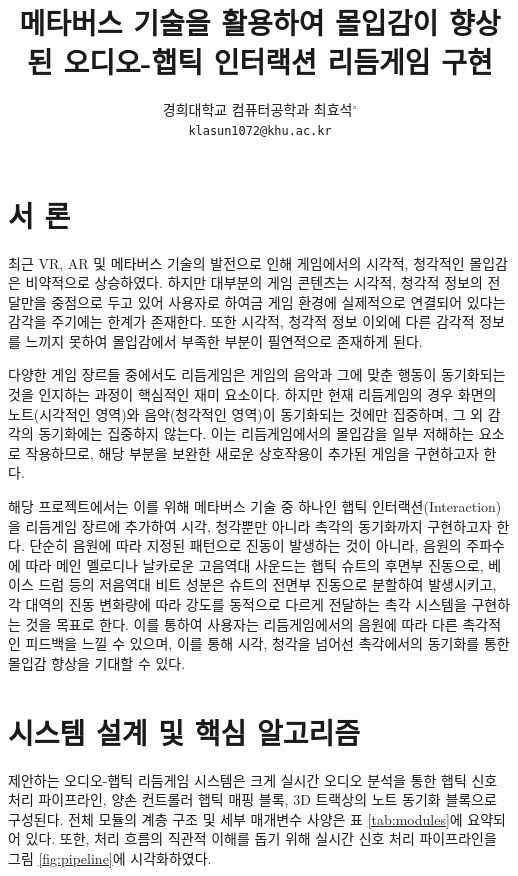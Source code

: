 \documentclass{kcc}
\title{메타버스 기술을 활용하여 몰입감이 향상된 오디오-햅틱 인터랙션 리듬게임 구현}
\author{
\vspace{4mm}
경희대학교 컴퓨터공학과 최효석$^{\circ}$\\
\texttt{klasun1072@khu.ac.kr}
\vspace{4mm}
}
\begin{document}
\maketitle

\section{서 론}
최근 VR, AR 및 메타버스 기술의 발전으로 인해 게임에서의 시각적, 청각적인 몰입감은 비약적으로 상승하였다. 하지만 대부분의 게임 콘텐츠는 시각적, 청각적 정보의 전달만을 중점으로 두고 있어 사용자로 하여금 게임 환경에 실제적으로 연결되어 있다는 감각을 주기에는 한계가 존재한다. 또한 시각적, 청각적 정보 이외에 다른 감각적 정보를 느끼지 못하여 몰입감에서 부족한 부분이 필연적으로 존재하게 된다.

다양한 게임 장르들 중에서도 리듬게임은 게임의 음악과 그에 맞춘 행동이 동기화되는 것을 인지하는 과정이 핵심적인 재미 요소이다. 하지만 현재 리듬게임의 경우 화면의 노트(시각적인 영역)와 음악(청각적인 영역)이 동기화되는 것에만 집중하며, 그 외 감각의 동기화에는 집중하지 않는다. 이는 리듬게임에서의 몰입감을 일부 저해하는 요소로 작용하므로, 해당 부분을 보완한 새로운 상호작용이 추가된 게임을 구현하고자 한다.

해당 프로젝트에서는 이를 위해 메타버스 기술 중 하나인 햅틱 인터랙션(Interaction)을 리듬게임 장르에 추가하여 시각, 청각뿐만 아니라 촉각의 동기화까지 구현하고자 한다. 단순히 음원에 따라 지정된 패턴으로 진동이 발생하는 것이 아니라, 음원의 주파수에 따라 메인 멜로디나 날카로운 고음역대 사운드는 햅틱 슈트의 후면부 진동으로, 베이스 드럼 등의 저음역대 비트 성분은 슈트의 전면부 진동으로 분할하여 발생시키고, 각 대역의 진동 변화량에 따라 강도를 동적으로 다르게 전달하는 촉각 시스템을 구현하는 것을 목표로 한다. 이를 통하여 사용자는 리듬게임에서의 음원에 따라 다른 촉각적인 피드백을 느낄 수 있으며, 이를 통해 시각, 청각을 넘어선 촉각에서의 동기화를 통한 몰입감 향상을 기대할 수 있다.

\section{시스템 설계 및 핵심 알고리즘}
제안하는 오디오-햅틱 리듬게임 시스템은 크게 실시간 오디오 분석을 통한 햅틱 신호 처리 파이프라인, 양손 컨트롤러 햅틱 매핑 블록, 3D 트랙상의 노트 동기화 블록으로 구성된다. 전체 모듈의 계층 구조 및 세부 매개변수 사양은 표 \ref{tab:modules}에 요약되어 있다. 또한, 처리 흐름의 직관적 이해를 돕기 위해 실시간 신호 처리 파이프라인을 그림 \ref{fig:pipeline}에 시각화하였다.
\end{document}
